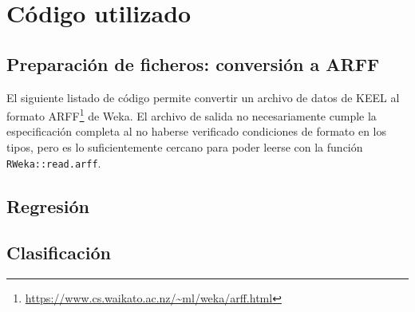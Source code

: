 \documentclass[a4paper, 11pt]{article}
\begin{document}
\section{Código utilizado}

\subsection{Preparación de ficheros: conversión a ARFF}
\label{sec:code:conv}

El siguiente listado de código permite convertir un archivo de datos de KEEL al formato ARFF\footnote{\url{https://www.cs.waikato.ac.nz/~ml/weka/arff.html}} de Weka. El archivo de salida no necesariamente cumple la especificación completa al no haberse verificado condiciones de formato en los tipos, pero es lo suficientemente cercano para poder leerse con la función \texttt{RWeka::read.arff}.


\subsection{Regresión}
\label{sec:code:regr}


\subsection{Clasificación}
\label{sec:code:clas}

\end{document}
